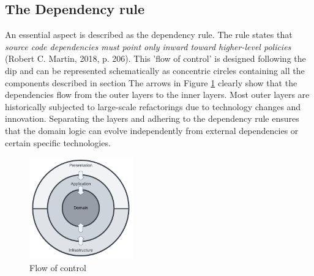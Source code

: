 \subsection{The Dependency rule} \label{subsec_dependency_rule}

An essential aspect is described as the dependency rule. The rule states that
\textit{source code dependencies must point only inward toward higher-level policies}
(Robert C. Martin, 2018, p. 206). This ’flow of control’ is designed following the
\gls{dip} and can be represented schematically as concentric circles containing all the
components described in section  The arrows in Figure
\ref{fig_modulair_components} clearly show that the dependencies flow from the outer
layers to the inner layers. Most outer layers are historically subjected to large-scale
refactorings due to technology changes and innovation. Separating the layers and adhering
to the dependency rule ensures that the domain logic can evolve independently from
external dependencies or certain specific technologies.

\begin{figure}[H]
    \centering
    \includegraphics[width=0.4\textwidth]{figures/ca_diagram.pdf}
    \caption[Flow of control]{Flow of control}
    \label{fig_modulair_components}
\end{figure}